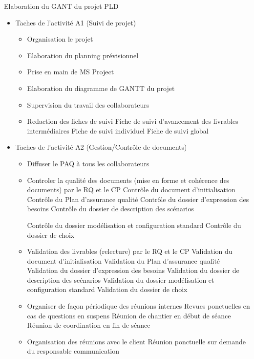 Elaboration du GANT du projet PLD
\begin{itemize}
    \item Taches de l’activité A1 (Suivi de projet)
    \begin{itemize}
        \item Organisation le projet
        \item Elaboration du planning prévisionnel
        \item Prise en main de MS Project
        \item Elaboration du diagramme de GANTT du projet
        \item Supervision du travail des collaborateurs
        \item Redaction des fiches de suivi
            \subitem Fiche de suivi d’avancement des livrables intermédiaires
            \subitem Fiche de suivi individuel
            \subitem Fiche de suivi global
    \end{itemize}

    \item Taches de l’activité A2 (Gestion/Contrôle de documents)
    \begin{itemize}
        \item Diffuser le  PAQ à tous les collaborateurs
        \item Controler la qualité des documents (mise en forme et cohérence des documents) par le RQ et le CP
            \subitem Contrôle du document d’initialisation
            \subitem Contrôle du Plan d’assurance qualité
            \subitem Contrôle du dossier d’expression des besoins
            \subitem Contrôle du dossier de description des scénarios

            \subitem Contrôle du dossier modélisation et configuration standard
            \subitem Contrôle du dossier de choix

        \item Validation des livrables (relecture) par le RQ et le CP
            \subitem Validation du document d’initialisation
            \subitem Validation du Plan d’assurance qualité
            \subitem Validation du dossier d’expression des besoins
            \subitem Validation du dossier de description des scénarios
            \subitem Validation du dossier modélisation et configuration standard
            \subitem Validation du dossier de choix

        \item Organiser de façon périodique des réunions internes
            \subitem Revues ponctuelles en cas de questions en suspens
            \subitem Réunion de chantier en début de séance
            \subitem Réunion de coordination en fin de séance
        \item Organisation des réunions avec le client
            \subitem Réunion ponctuelle sur demande du responsable communication
    \end{itemize}



\end{itemize}
